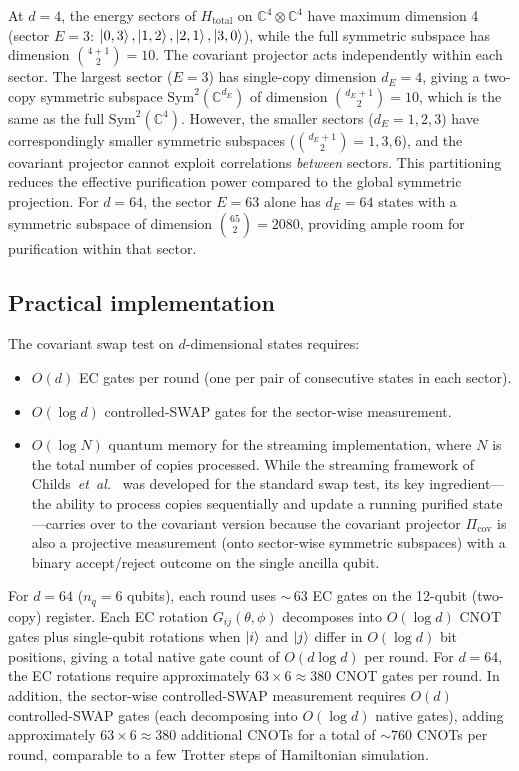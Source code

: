 \documentclass[prx,twocolumn,superscriptaddress,longbibliography,floatfix]{revtex4-2}
\begin{document}
At $d = 4$, the energy sectors of $H_\mathrm{total}$ on $\mathbb{C}^4 \otimes \mathbb{C}^4$ have maximum dimension 4 (sector $E = 3$: $\ket{0,3}, \ket{1,2}, \ket{2,1}, \ket{3,0}$), while the full symmetric subspace has dimension $\binom{4+1}{2} = 10$.
The covariant projector acts independently within each sector.
The largest sector ($E = 3$) has single-copy dimension $d_E = 4$, giving a two-copy symmetric subspace $\mathrm{Sym}^2(\mathbb{C}^{d_E})$ of dimension $\binom{d_E+1}{2} = 10$, which is the same as the full $\mathrm{Sym}^2(\mathbb{C}^4)$.
However, the smaller sectors ($d_E = 1, 2, 3$) have correspondingly smaller symmetric subspaces ($\binom{d_E+1}{2} = 1, 3, 6$), and the covariant projector cannot exploit correlations \emph{between} sectors.
This partitioning reduces the effective purification power compared to the global symmetric projection.
For $d = 64$, the sector $E = 63$ alone has $d_E = 64$ states with a symmetric subspace of dimension $\binom{65}{2} = 2080$, providing ample room for purification within that sector.

\subsection{Practical implementation}
\label{sec:implementation}

The covariant swap test on $d$-dimensional states requires:
\begin{itemize}
\item $O(d)$ EC gates per round (one per pair of consecutive states in each sector).
\item $O(\log d)$ controlled-SWAP gates for the sector-wise measurement.
\item $O(\log N)$ quantum memory for the streaming implementation, where $N$ is the total number of copies processed.
While the streaming framework of Childs~\emph{et~al.}~\cite{Childs2025} was developed for the standard swap test, its key ingredient---the ability to process copies sequentially and update a running purified state---carries over to the covariant version because the covariant projector $\Pi_\mathrm{cov}$ is also a projective measurement (onto sector-wise symmetric subspaces) with a binary accept/reject outcome on the single ancilla qubit.
\end{itemize}
For $d = 64$ ($n_q = 6$ qubits), each round uses ${\sim}\,63$ EC gates on the 12-qubit (two-copy) register.
Each EC rotation $G_{ij}(\theta, \phi)$ decomposes into $O(\log d)$ CNOT gates plus single-qubit rotations when $\ket{i}$ and $\ket{j}$ differ in $O(\log d)$ bit positions, giving a total native gate count of $O(d \log d)$ per round.
For $d = 64$, the EC rotations require approximately $63 \times 6 \approx 380$ CNOT gates per round.
In addition, the sector-wise controlled-SWAP measurement requires $O(d)$ controlled-SWAP gates (each decomposing into $O(\log d)$ native gates), adding approximately $63 \times 6 \approx 380$ additional CNOTs for a total of $\sim\!760$ CNOTs per round, comparable to a few Trotter steps of Hamiltonian simulation.
\end{document}
